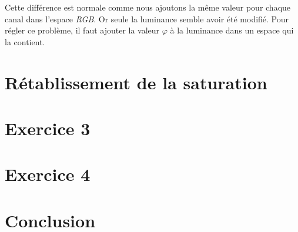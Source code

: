 \documentclass[a4paper,11pt]{article}
\begin{document}
Cette différence est normale comme nous ajoutons la même valeur pour 
chaque canal dans l'espace \textit{RGB}. Or seule la luminance semble
avoir été modifié. Pour régler ce problème, il faut ajouter la valeur 
$\varphi$ à la luminance dans un espace qui la contient. 

\section{Rétablissement de la saturation}

\section{Exercice 3}

\section{Exercice 4}

\section*{Conclusion}
\end{document}
